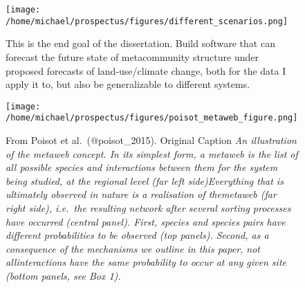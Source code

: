 \begin{figure}
\centering
\texttt{[image: /home/michael/prospectus/figures/different\_scenarios.png]}
\caption{This is the end goal of the dissertation. Build software that
can forecast the future state of metacommunity structure under proposed
forecasts of land-use/climate change, both for the data I apply it to,
but also be generalizable to different systems.}
\end{figure}

\begin{figure}
\centering
\texttt{[image: /home/michael/prospectus/figures/poisot\_metaweb\_figure.png]}
\caption{From Poisot et al.~(@poisot\_2015). Original Caption \emph{An
illustration of the metaweb concept. In its simplest form, a metaweb is
the list of all possible species and interactions between them for the
system being studied, at the regional level (far left side)Everything
that is ultimately observed in nature is a realisation of themetaweb
(far right side), i.e.~the resulting network after several sorting
processes have occurred (central panel). First, species and species
pairs have different probabilities to be observed (top panels). Second,
as a consequence of the mechanisms we outline in this paper, not
allinteractions have the same probability to occur at any given site
(bottom panels, see Box 1).}}
\end{figure}

